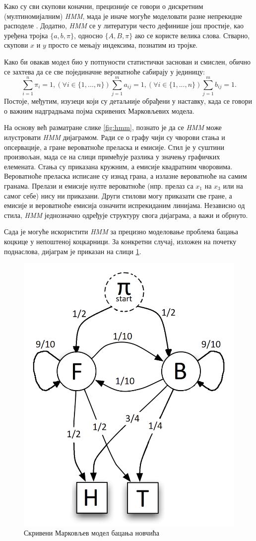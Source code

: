 \documentclass[12pt,oneside]{memoir}
\begin{document}
\begin{CJK}{UTF8}{ipxm}
Како су сви скупови коначни, прецизније се говори о дискретним (мултиномијалним) \textit{HMM}, мада је иначе могуће моделовати разне непрекидне расподеле \cite{tian2020}. Додатно, \textit{HMM} се у литератури често дефинише још простије, као уређена тројка $\{a, b, \pi\}$, односно $\{A, B, \pi\}$ ако се користе велика слова. Стварно, скупови $x$ и $y$ просто се мењају индексима, познатим из тројке.

Како би овакав модел био у потпуности статистички заснован и смислен, обично се захтева да се све појединачне вероватноће сабирају у јединицу: $$\sum_{i=1}^n \pi_i = 1, (\forall i \in \{1, ..., n\}) \sum_{j=1}^m a_{ij} = 1, (\forall i \in \{1, ..., n\}) \sum_{j=1}^m b_{ij} = 1.$$ Постоје, међутим, изузеци који су детаљније обрађени у наставку, када се говори о важним надградњама појма скривених Марковљевих модела.

На основу већ разматране слике \ref{fig:hmm}, познато је да се \textit{HMM} може илустровати \textit{HMM} дијаграмом. Ради се о графу чији су чворови стања и опсервације, а гране вероватноће преласка и емисије. Стил је у суштини произвољан, мада се на слици примећује разлика у значењу графичких елемената. Стања су приказана кружним, а емисије квадратним чворовима. Вероватноће преласка исписане су изнад грана, а излазне вероватноће на самим гранама. Прелази и емисије нулте вероватноће (нпр. прелаз са $x_1$ на $x_3$ или на самог себе) нису ни приказани. Други стилови могу приказати све гране, а емисије и вероватноће емисија означити испрекиданим линијама. Независно од стила, \textit{HMM} једнозначно одређује структуру свога дијаграма, а важи и обрнуто.

Сада је могуће искористити \textit{HMM} за прецизно моделовање проблема бацања коцкице у непоштеној коцкарници. За конкретни случај, изложен на почетку поднаслова, дијаграм је приказан на слици \ref{fig:kock}.

\begin{figure}[H]
  \centering
  \includegraphics[width=.5\textwidth]{kockarnica.png}
  \caption{Скривени Марковљев модел бацања новчића}
  \label{fig:kock}
\end{figure}


\end{CJK}
\end{document}
